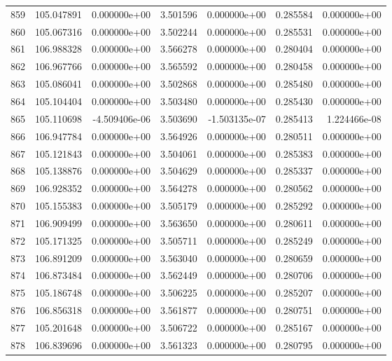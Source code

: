 \begin{tabular}{rrrrrrr}
 859 & 105.047891 &  0.000000e+00 &  3.501596 &  0.000000e+00 &   0.285584 &  0.000000e+00 \\
 860 & 105.067316 &  0.000000e+00 &  3.502244 &  0.000000e+00 &   0.285531 &  0.000000e+00 \\
 861 & 106.988328 &  0.000000e+00 &  3.566278 &  0.000000e+00 &   0.280404 &  0.000000e+00 \\
 862 & 106.967766 &  0.000000e+00 &  3.565592 &  0.000000e+00 &   0.280458 &  0.000000e+00 \\
 863 & 105.086041 &  0.000000e+00 &  3.502868 &  0.000000e+00 &   0.285480 &  0.000000e+00 \\
 864 & 105.104404 &  0.000000e+00 &  3.503480 &  0.000000e+00 &   0.285430 &  0.000000e+00 \\
 865 & 105.110698 & -4.509406e-06 &  3.503690 & -1.503135e-07 &   0.285413 &  1.224466e-08 \\
 866 & 106.947784 &  0.000000e+00 &  3.564926 &  0.000000e+00 &   0.280511 &  0.000000e+00 \\
 867 & 105.121843 &  0.000000e+00 &  3.504061 &  0.000000e+00 &   0.285383 &  0.000000e+00 \\
 868 & 105.138876 &  0.000000e+00 &  3.504629 &  0.000000e+00 &   0.285337 &  0.000000e+00 \\
 869 & 106.928352 &  0.000000e+00 &  3.564278 &  0.000000e+00 &   0.280562 &  0.000000e+00 \\
 870 & 105.155383 &  0.000000e+00 &  3.505179 &  0.000000e+00 &   0.285292 &  0.000000e+00 \\
 871 & 106.909499 &  0.000000e+00 &  3.563650 &  0.000000e+00 &   0.280611 &  0.000000e+00 \\
 872 & 105.171325 &  0.000000e+00 &  3.505711 &  0.000000e+00 &   0.285249 &  0.000000e+00 \\
 873 & 106.891209 &  0.000000e+00 &  3.563040 &  0.000000e+00 &   0.280659 &  0.000000e+00 \\
 874 & 106.873484 &  0.000000e+00 &  3.562449 &  0.000000e+00 &   0.280706 &  0.000000e+00 \\
 875 & 105.186748 &  0.000000e+00 &  3.506225 &  0.000000e+00 &   0.285207 &  0.000000e+00 \\
 876 & 106.856318 &  0.000000e+00 &  3.561877 &  0.000000e+00 &   0.280751 &  0.000000e+00 \\
 877 & 105.201648 &  0.000000e+00 &  3.506722 &  0.000000e+00 &   0.285167 &  0.000000e+00 \\
 878 & 106.839696 &  0.000000e+00 &  3.561323 &  0.000000e+00 &   0.280795 &  0.000000e+00 \\

\end{tabular}
